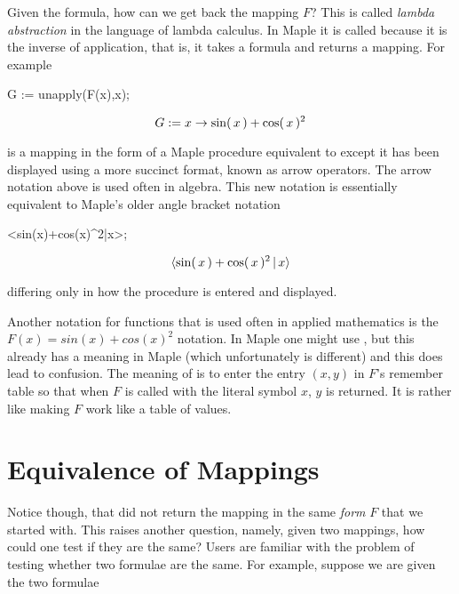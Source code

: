 \documentclass[11pt,dvips]{mtn}
\begin{document}
Given the formula, how can we get back the mapping $F$?
This is called {\em lambda abstraction} in the language of lambda calculus.
In Maple it is called  because it
is the inverse of application, that is, it takes a formula and returns
a mapping. For example

\begin{mapleinput}
G := unapply(F(x),x);
\end{mapleinput}
\begin{maplelatex}
\[
{G} := {x} \rightarrow {\rm sin}(\,{x}\,) + {\rm cos}(\,{x}\,)^{2
}
\]
\end{maplelatex}
is a mapping in the form of a Maple procedure equivalent to 
 except it has been
displayed using a more succinct format, 
known as arrow operators.  The arrow notation above is used often in algebra.
This new notation is essentially equivalent to Maple's
older angle bracket notation

\begin{mapleinput}
<sin(x)+cos(x)^2|x>;
\end{mapleinput}
\begin{maplelatex}
\[
 \langle {\rm sin}(\,{x}\,) + {\rm cos}(\,{x}\,)^{2}\,{ \mid}\,{x
} \rangle 
\]
\end{maplelatex}
differing only in how the procedure is entered and displayed.

Another notation for functions that is used often in applied mathematics
is the $F(x)=sin(x)+cos(x)^2$ notation.  In Maple one might use
, but this already has a meaning in Maple (which
unfortunately is different) and this does lead to confusion.
The meaning of  is to enter the entry $(x,y)$ in $F$'s remember
table so that when $F$ is called with the literal symbol
$x$, $y$ is returned.  It is rather like making $F$ work like a table
of values.

\section{Equivalence of Mappings}

Notice though, that  did not return the mapping
in the same {\em form} $F$ that we started with.
This raises another question, namely, given two mappings, how could one
test if they are the same?  Users are familiar with the problem of testing
whether two formulae are the same.  For example, suppose we are
given the two formulae
\end{document}
